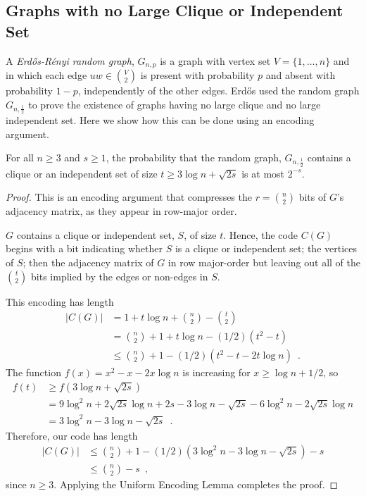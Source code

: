 \documentclass{patmorin}
\begin{document}
\subsection{Graphs with no Large Clique or Independent Set}


A \emph{Erd\H{o}s-R\'enyi random graph}, $G_{n,p}$ is a graph with vertex
set $V=\{1,\ldots,n\}$ and in which each edge $uw\in \binom{V}{2}$
is present with probability $p$ and absent with probability $1-p$,
independently of the other edges.  Erd\H{o}s \cite{erdos:some} used the random
graph $G_{n,\frac{1}{2}}$ to prove the existence of graphs having no
large clique and no large independent set. Here we show how this can be
done using an encoding argument.

\begin{thm}
  For all $n\ge 3$ and $s\ge 1$, the probability that the random
  graph, $G_{n,\frac{1}{2}}$ contains a clique or an independent set
  of size $t \ge 3\log n + \sqrt{2s}$ is at most $2^{-s}$.
\end{thm}

\begin{proof}
  This is an encoding argument that compresses the $r=\binom{n}{2}$
  bits of $G$'s adjacency matrix, as they appear in row-major order.
  
  $G$ contains a clique or independent set, $S$, of size $t$. Hence,
  the code $C(G)$ begins with a bit indicating whether $S$ is a clique
  or independent set; the vertices of $S$; then the adjacency matrix
  of $G$ in row major-order but leaving out all of the $\binom{t}{2}$
  bits implied by the edges or non-edges in $S$.
  
  This encoding has length
  \begin{align*}
    |C(G)| & = 1 + t\log n + \binom{n}{2}-\binom{t}{2} \\
           & = \binom{n}{2} + 1 + t\log n - (1/2)(t^2 - t) \\
           & \le \binom{n}{2} + 1 - (1/2)(t^2 - t - 2t \log n) \enspace .
  \end{align*}
  The function $f(x) = x^2 - x - 2x \log n$ is increasing for
  $x \geq \log n + 1/2$, so
  \begin{align*}
    f(t) &\ge f(3\log n + \sqrt{2s}) \\
    &= 9 \log^2 n + 2 \sqrt{2s} \log n + 2s - 3 \log n - \sqrt{2s} - 6 \log^2 n - 2 \sqrt{2s} \log n \\
    &= 3 \log^2 n - 3 \log n - \sqrt{2s} \enspace .
  \end{align*}
  Therefore, our code has length
  \begin{align*}
    |C(G)| & \le \binom{n}{2} + 1 - (1/2)(3 \log^2 n - 3 \log n - \sqrt{2s}) - s \\
           & \le \binom{n}{2} - s \enspace ,
  \end{align*}
  since $n \ge 3$. Applying the Uniform Encoding Lemma completes the
  proof.
\end{proof}
\end{document}
